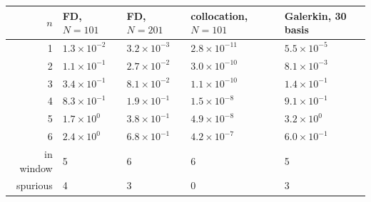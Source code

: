 \begin{tabular}{rllll}
\toprule
$n$ & FD, $N=101$ & FD, $N=201$ & collocation, $N=101$ & Galerkin, 30 basis\\
\midrule
1 & $1.3\times10^{-2}$ & $3.2\times10^{-3}$ & $2.8\times10^{-11}$ & $5.5\times10^{-5}$\\
2 & $1.1\times10^{-1}$ & $2.7\times10^{-2}$ & $3.0\times10^{-10}$ & $8.1\times10^{-3}$\\
3 & $3.4\times10^{-1}$ & $8.1\times10^{-2}$ & $1.1\times10^{-10}$ & $1.4\times10^{-1}$\\
4 & $8.3\times10^{-1}$ & $1.9\times10^{-1}$ & $1.5\times10^{-8}$ & $9.1\times10^{-1}$\\
5 & $1.7\times10^{0}$ & $3.8\times10^{-1}$ & $4.9\times10^{-8}$ & $3.2\times10^{0}$\\
6 & $2.4\times10^{0}$ & $6.8\times10^{-1}$ & $4.2\times10^{-7}$ & $6.0\times10^{-1}$\\
\midrule
in window & 5 & 6 & 6 & 5\\
spurious & 4 & 3 & 0 & 3\\
\bottomrule
\end{tabular}
